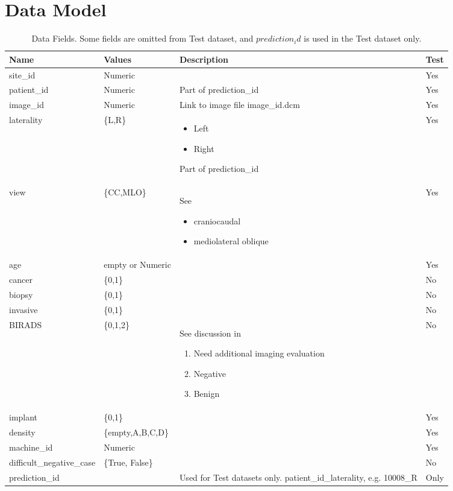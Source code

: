 \documentclass[]{article}
\begin{document}
\section{Data Model}
\begin{table}[H]
	\begin{center}
		\caption[Data Fields]{Data Fields. Some fields are omitted from Test dataset, and $prediction_id$ is used in the Test dataset only.}
		\begin{tabular}{|l|l|p{5cm}|l|}   \hline
			Name&Values&Description&Test\\  \hline
			site\_id&Numeric&&Yes\\  \hline
			patient\_id&Numeric&Part of	prediction\_id&Yes\\  \hline
			image\_id&Numeric&Link to image file image\_id.dcm&Yes\\  \hline
			laterality&\{L,R\}&\begin{itemize}
				\item Left
				\item Right
			\end{itemize}Part of	prediction\_id&Yes\\  \hline
			view&\{CC,MLO\}& See \cite{murphy2021mamography} \begin{itemize}
				\item craniocaudal 
				\item mediolateral oblique
			\end{itemize}&Yes\\  \hline
			age&empty or Numeric&&Yes\\  \hline
			cancer&\{0,1\}&&No\\  \hline
			biopsy&\{0,1\}&&No\\  \hline
			invasive&\{0,1\}&&No\\  \hline
			BIRADS&\{0,1,2\}&See discussion in \cite{pan2022what}\begin{enumerate}[start=0]
				\item Need additional imaging evaluation
				\item Negative
				\item Benign
			\end{enumerate}&No\\  \hline
			implant&\{0,1\}&&Yes\\  \hline
			density&\{empty,A,B,C,D\}&&Yes\\  \hline
			machine\_id&Numeric&&Yes\\  \hline
			difficult\_negative\_case&\{True, False\}&&No\\  \hline
			prediction\_id&&Used for Test datasets only. patient\_id\_laterality, e.g. 10008\_R&Only\\  \hline
		\end{tabular}
	\end{center}
\end{table}


\end{document}
